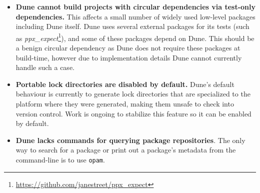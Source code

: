 \documentclass{article}
\begin{document}
\begin{multicols}{2}
        \begin{itemize}
            \item \textbf{Dune cannot build projects with circular dependencies
                via test-only dependencies.} This affects a small number of
                widely used low-level packages including Dune itself. Dune uses
                several external packages for its tests (such as
                \textit{ppx\_expect}\footnote{\url{https://github.com/janestreet/ppx_expect}}),
                and some of these packages depend on
                Dune. This should be a benign circular dependency as Dune does
                not require these packages at build-time, however due to
                implementation details Dune cannot currently handle such a case.
            \item \textbf{Portable lock directories are disabled by default.}
                Dune's default behaviour is currently to generate lock
                directories that are specialized to the platform where they were
                generated, making them unsafe to check into version control.
                Work is ongoing to stabilize this feature so it can be enabled
                by default.
            \item \textbf{Dune lacks commands for querying package
                repositories}. The only way to search for a package or print out
                a package's metadata from the command-line is to use \texttt{opam}.
        \end{itemize}

    \end{multicols}
\end{document}
